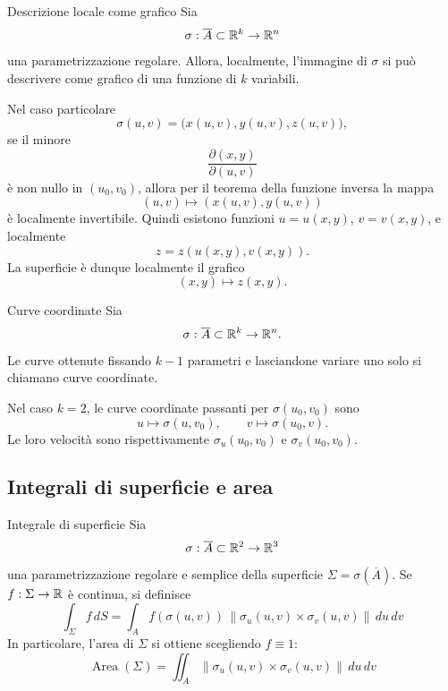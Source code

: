 \documentclass[a4paper]{article}
\begin{document}
\begin{radioactive}
\begin{snippetproposition}{Descrizione locale come grafico}
    Sia
    \[
        \sigma:\overline{A}\subset\mathbb{R}^k\to\mathbb{R}^n
    \]
    una parametrizzazione regolare. Allora, localmente, l'immagine di \(\sigma\) si può descrivere come
    grafico di una funzione di \(k\) variabili.

    Nel caso particolare
    \[
        \sigma(u,v)=\bigl(x(u,v),y(u,v),z(u,v)\bigr),
    \]
    se il minore
    \[
        \frac{\partial(x,y)}{\partial(u,v)}
    \]
    è non nullo in \((u_0,v_0)\), allora per il teorema della funzione inversa la mappa
    \[
        (u,v)\mapsto (x(u,v),y(u,v))
    \]
    è localmente invertibile. Quindi esistono funzioni \(u=u(x,y)\), \(v=v(x,y)\), e localmente
    \[
        z=z(u(x,y),v(x,y)).
    \]
    La superficie è dunque localmente il grafico
    \[
        (x,y)\mapsto z(x,y).
    \]
\end{snippetproposition}
\end{radioactive}

\begin{radioactive}
\begin{snippetdefinition}{Curve coordinate}
    Sia
    \[
        \sigma:\overline{A}\subset\mathbb{R}^k\to\mathbb{R}^n.
    \]
    Le curve ottenute fissando \(k-1\) parametri e lasciandone variare uno solo si chiamano curve
    coordinate.
\end{snippetdefinition}
\end{radioactive}

\begin{radioactive}
Nel caso \(k=2\), le curve coordinate passanti per \(\sigma(u_0,v_0)\) sono
\[
    u\mapsto \sigma(u,v_0),
    \qquad
    v\mapsto \sigma(u_0,v).
\]
Le loro velocità sono rispettivamente \(\sigma_u(u_0,v_0)\) e \(\sigma_v(u_0,v_0)\).
\end{radioactive}

\subsection{Integrali di superficie e area}

\begin{radioactive}
\begin{snippetdefinition}{Integrale di superficie}
    Sia
    \[
        \sigma:\overline{A}\subset\mathbb{R}^2\to\mathbb{R}^3
    \]
    una parametrizzazione regolare e semplice della superficie \(\Sigma=\sigma(\overline{A})\). Se
    \(f:\Sigma\to\mathbb{R}\) è continua, si definisce
    \[
        \int_\Sigma f\,dS
        =
        \int_A f(\sigma(u,v))\,\|\sigma_u(u,v)\times\sigma_v(u,v)\|\, du\,dv
    \]
    In particolare, l'area di \(\Sigma\) si ottiene scegliendo \(f\equiv1\):
    \[
        \operatorname{Area}(\Sigma)
        =
        \iint_A \|\sigma_u(u,v)\times\sigma_v(u,v)\|\, du\,dv
    \]
\end{snippetdefinition}
\end{radioactive}
\end{document}
